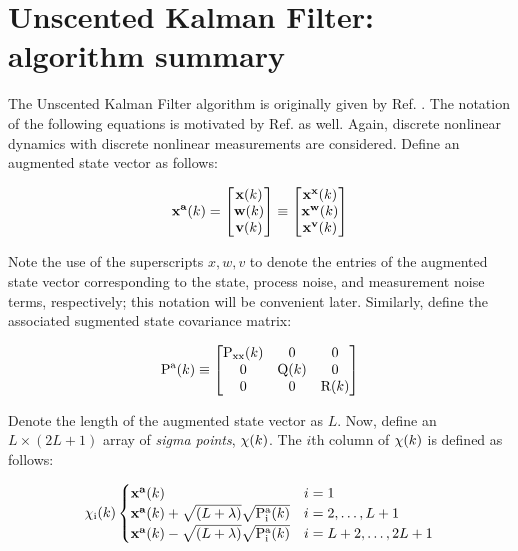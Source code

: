 \section{Unscented Kalman Filter: algorithm summary}

The Unscented Kalman Filter algorithm is originally given by Ref. \cite{wan2000}. The notation of the following equations is motivated by Ref. \cite{woodbury2015} as well.
Again, discrete nonlinear dynamics with discrete nonlinear measurements are considered.
Define an augmented state vector as follows:

\begin{equation}
\mathrm{\mathbf{x^a}}(k) = \begin{bmatrix}
\mathrm{\mathbf{x}}(k) \\\mathrm{\mathbf{w}}(k) \\\mathrm{\mathbf{v}}(k)
\end{bmatrix} \equiv \begin{bmatrix}
\mathrm{\mathbf{x^x}}(k) \\ \mathrm{\mathbf{x^w}}(k) \\\mathrm{\mathbf{x^v}}(k)
\end{bmatrix}
\end{equation}

Note the use of the superscripts $x,w,v$ to denote the entries of the augmented state vector corresponding to the state, process noise, and measurement noise terms, respectively; this notation will be convenient later.
Similarly, define the associated sugmented state covariance matrix:

\begin{equation}
\mathrm{P^a}(k) \equiv \begin{bmatrix}
{\ensuremath{\mathrm{P_{xx}}}}(k) & 0 & 0\\
0 & \mathrm{Q}(k) & 0\\
0 & 0 & \mathrm{R}(k)
\end{bmatrix}
\end{equation}

Denote the length of the augmented state vector as $L$.
Now, define an $L \times (2L+1)$ array of \textit{sigma points}, $\mathrm{\chi}(k)$.
The $i$th column of $\mathrm{\chi}(k)$ is defined as follows:

\begin{equation}
\mathrm{\chi_i}(k)
\begin{cases}
\mathrm{\mathbf{x^a}}(k) & i = 1\\
\mathrm{\mathbf{x^a}}(k) + \sqrt{(L+\lambda)}\sqrt{\mathrm{P^a_i}(k)} & i = 2,\dots,L+1\\
\mathrm{\mathbf{x^a}}(k) - \sqrt{(L+\lambda)}\sqrt{\mathrm{P^a_i}(k)} & i = L+2,\dots,2L+1
\end{cases}
\end{equation}

